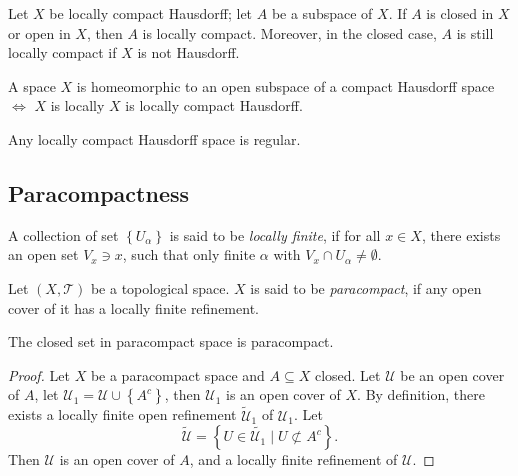 \begin{corollary}
  Let \( X \) be locally compact Hausdorff;
  let \( A \) be a subspace of \( X \).
  If \( A \) is closed in \( X \) or open in \( X \), then \( A \) is locally compact.
  Moreover, in the closed case, \( A \) is still locally compact if \( X \) is not Hausdorff.
\end{corollary}

\begin{corollary}
  A space \( X \) is homeomorphic to an open subspace of a compact Hausdorff space \( \iff \) \( X \) is locally \( X \) is locally compact Hausdorff.
\end{corollary}

\begin{corollary}
  Any locally compact Hausdorff space is regular.
\end{corollary}

\subsection{Paracompactness}

\begin{definition}
  A collection of set \( \left\lbrace U_\alpha \right\rbrace \) is said to be \emph{locally finite}, if for all \( x \in X \), there exists an open set \( V_x \ni x \), such that only finite \( \alpha \) with \( V_x \cap U_\alpha \neq \emptyset \).
\end{definition}

\begin{definition}
  Let \( (X, \mathcal{T}) \) be a topological space.
  \( X \) is said to be \emph{paracompact}, if any open cover of it has a locally finite refinement.
\end{definition}

\begin{proposition}
  The closed set in paracompact space is paracompact.
\end{proposition}
\begin{proof}
  Let \( X \) be a paracompact space and \( A \subseteq X \) closed.
  Let \( \mathcal{U} \) be an open cover of \( A \), let \( \mathcal{U}_1 = \mathcal{U} \cup \left\lbrace A^c \right\rbrace \), then \( \mathcal{U}_1 \) is an open cover of \( X \).
  By definition, there exists a locally finite open refinement \( \widetilde{\mathcal{U}}_1 \) of \( \mathcal{U}_1 \). Let
  \[
    \widetilde{\mathcal{U}} = \left\lbrace U \in \widetilde{\mathcal{U}_1} \mid U \not\subset A^c \right\rbrace.
  \]
  Then \( \mathcal{U} \) is an open cover of \( A \), and a locally finite refinement of  \( \mathcal{U} \).
\end{proof}

